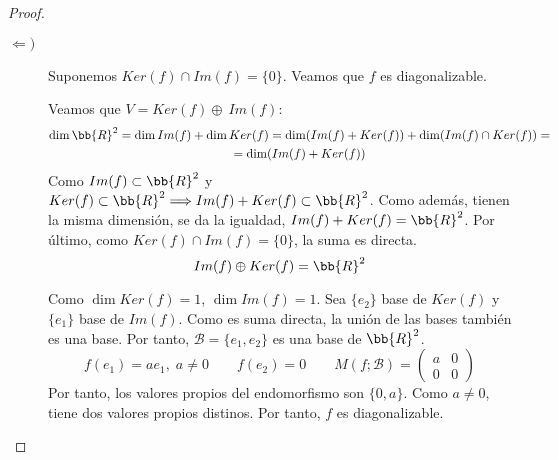 \begin{ejercicio}
\begin{proof}
\begin{description}
            \item [$\Longleftarrow )$]Suponemos $Ker(f) \cap Im(f)=\{0\}$. Veamos que $f$ es diagonalizable.

            Veamos que $V = Ker(f) \oplus~Im(f)$:
            \begin{multline*}
                \dim \bb{R}^2 = \dim Im(f) + \dim Ker(f) = 
                \dim(Im(f) + Ker(f)) + \dim(Im(f) \cap Ker(f)) = \\ = \dim(Im(f) + Ker(f))
            \end{multline*}
            Como $Im(f)\subset \bb{R}^2$ y $Ker(f)\subset \bb{R}^2 \Longrightarrow Im(f) + Ker(f) \subset \bb{R}^2$. Como además, tienen la misma dimensión, se da la igualdad, $Im(f) + Ker(f) = \bb{R}^2$. Por último, como $Ker(f) \cap Im(f)=\{0\}$, la suma es directa.
            $$Im(f) \oplus Ker(f) = \bb{R}^2$$

            Como $\dim Ker(f)=1$, $\dim Im(f) = 1$. Sea $\{e_2\}$ base de $Ker(f)$ y $\{e_1\}$ base de $Im(f)$. Como es suma directa, la unión de las bases también es una base. Por tanto, $\mathcal{B} = \{e_1, e_2\}$ es una base de $\bb{R}^2$.
            $$f(e_1) = ae_1,\; a\neq 0 \qquad f(e_2) = 0 \qquad M(f;\mathcal{B}) = \left(\begin{array}{cc}
                a & 0 \\
                0 & 0
            \end{array} \right)$$
            Por tanto, los valores propios del endomorfismo son $\{0,a\}$. Como $a \neq 0$, tiene dos valores propios distinos. Por tanto, $f$ es diagonalizable.\qedhere
        \end{description}
    \end{proof}
\end{ejercicio}

